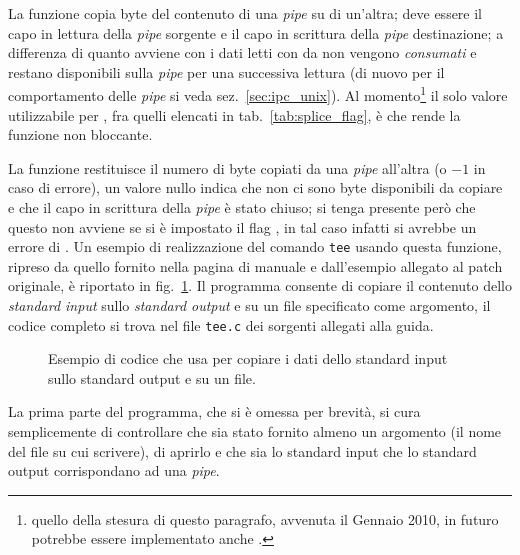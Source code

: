 La funzione copia  byte del contenuto di una \textit{pipe} su di
un'altra;  deve essere il capo in lettura della \textit{pipe}
sorgente e  il capo in scrittura della \textit{pipe}
destinazione; a differenza di quanto avviene con  i dati letti con
 da  non vengono \textsl{consumati} e restano
disponibili sulla \textit{pipe} per una successiva lettura (di nuovo per il
comportamento delle \textit{pipe} si veda sez.~\ref{sec:ipc_unix}). Al
momento\footnote{quello della stesura di questo paragrafo, avvenuta il Gennaio
  2010, in futuro potrebbe essere implementato anche .}
il solo valore utilizzabile per , fra quelli elencati in
tab.~\ref{tab:splice_flag}, è  che rende la
funzione non bloccante.

La funzione restituisce il numero di byte copiati da una \textit{pipe}
all'altra (o $-1$ in caso di errore), un valore nullo indica che non ci sono
byte disponibili da copiare e che il capo in scrittura della \textit{pipe} è
stato chiuso; si tenga presente però che questo non avviene se si è impostato
il flag , in tal caso infatti si avrebbe un errore
di . Un esempio di realizzazione del comando \texttt{tee}
usando questa funzione, ripreso da quello fornito nella pagina di manuale e
dall'esempio allegato al patch originale, è riportato in
fig.~\ref{fig:tee_example}. Il programma consente di copiare il contenuto
dello \textit{standard input} sullo \textit{standard output} e su un file
specificato come argomento, il codice completo si trova nel file
\texttt{tee.c} dei sorgenti allegati alla guida.

\begin{figure}[!htb]
  \footnotesize \centering
  \begin{minipage}[c]{\codesamplewidth}
  \end{minipage}
  \normalsize
  \caption{Esempio di codice che usa  per copiare i dati dello
    standard input sullo standard output e su un file.}
  \label{fig:tee_example}
\end{figure}

La prima parte del programma, che si è omessa per brevità, si cura
semplicemente di controllare che sia stato fornito almeno un argomento (il
nome del file su cui scrivere), di aprirlo e che sia lo standard input che lo
standard output corrispondano ad una \textit{pipe}.

